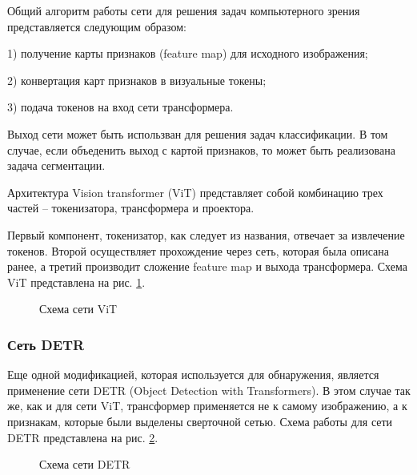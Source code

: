 \documentclass[14pt,a4paper]{extarticle}
\begin{document}
Общий алгоритм работы сети для решения задач компьютерного зрения представляется следующим образом:

1) получение карты признаков (feature map) для исходного изображения;

2) конвертация карт признаков в визуальные токены;

3) подача токенов на вход сети трансформера.

Выход сети может быть использван для решения задач классификации. В том случае, если объеденить выход с картой признаков, то может быть реализована задача сегментации. 

Архитектура Vision transformer (ViT) представляет собой комбинацию трех частей -- токенизатора, трансформера и проектора. 

Первый компонент, токенизатор, как следует из названия, отвечает за извлечение токенов. Второй осуществляет прохождение через сеть, которая была описана ранее, а третий производит сложение feature map и выхода трансформера. Схема ViT представлена на рис. \ref{vitr_lbl}.
\begin{figure}[h!]
\caption{Схема сети ViT}
\label{vitr_lbl}
\end{figure} 

\newpage
\subsubsection*{Сеть DETR}
Еще одной модификацией, которая используется для обнаружения, является применение сети DETR (Object Detection with Transformers). В этом случае так же, как и для сети ViT, трансформер применяется не к самому изображению, а к признакам, которые были выделены сверточной сетью. Схема работы для сети DETR представлена на рис. \ref{detr_lbl}.
\begin{figure}[b!]
\caption{Схема сети DETR}
\label{detr_lbl}
\end{figure} 
\end{document}
